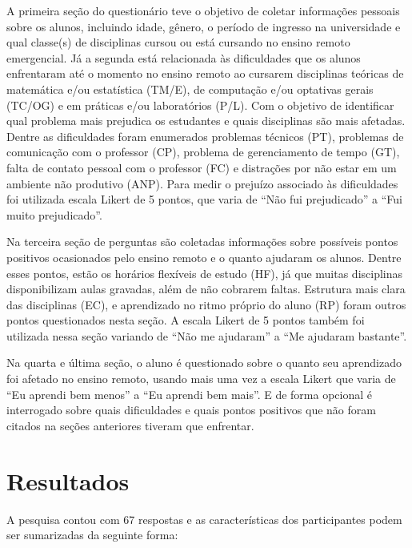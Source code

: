 \documentclass[
  12pt,
  portuguese,
]{article}
\begin{document}
A primeira seção do questionário teve o objetivo de coletar informações
pessoais sobre os alunos, incluindo idade, gênero, o período de ingresso
na universidade e qual classe(s) de disciplinas cursou ou está cursando
no ensino remoto emergencial. Já a segunda está relacionada às
dificuldades que os alunos enfrentaram até o momento no ensino remoto ao
cursarem disciplinas teóricas de matemática e/ou estatística (TM/E), de
computação e/ou optativas gerais (TC/OG) e em práticas e/ou laboratórios
(P/L). Com o objetivo de identificar qual problema mais prejudica os
estudantes e quais disciplinas são mais afetadas. Dentre as dificuldades
foram enumerados problemas técnicos (PT), problemas de comunicação com o
professor (CP), problema de gerenciamento de tempo (GT), falta de
contato pessoal com o professor (FC) e distrações por não estar em um
ambiente não produtivo (ANP). Para medir o prejuízo associado às
dificuldades foi utilizada escala Likert de 5 pontos, que varia de ``Não
fui prejudicado'' a ``Fui muito prejudicado''.

Na terceira seção de perguntas são coletadas informações sobre possíveis
pontos positivos ocasionados pelo ensino remoto e o quanto ajudaram os
alunos. Dentre esses pontos, estão os horários flexíveis de estudo (HF),
já que muitas disciplinas disponibilizam aulas gravadas, além de não
cobrarem faltas. Estrutura mais clara das disciplinas (EC), e
aprendizado no ritmo próprio do aluno (RP) foram outros pontos
questionados nesta seção. A escala Likert de 5 pontos também foi
utilizada nessa seção variando de ``Não me ajudaram'' a ``Me ajudaram
bastante''.

Na quarta e última seção, o aluno é questionado sobre o quanto seu
aprendizado foi afetado no ensino remoto, usando mais uma vez a escala
Likert que varia de ``Eu aprendi bem menos'' a ``Eu aprendi bem mais''.
E de forma opcional é interrogado sobre quais dificuldades e quais
pontos positivos que não foram citados na seções anteriores tiveram que
enfrentar.

\hypertarget{resultados}{%
\section{Resultados}\label{resultados}}

A pesquisa contou com 67 respostas e as características dos
participantes podem ser sumarizadas da seguinte forma:
\end{document}
